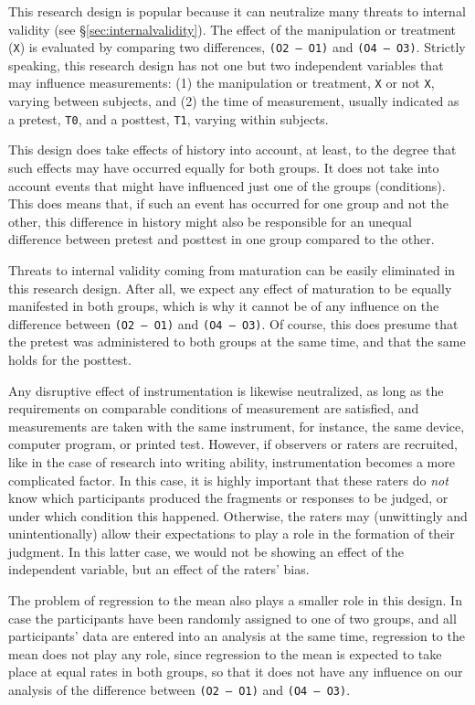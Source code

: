 \documentclass[
]{book}
\begin{document}
This research design is popular because it can neutralize many threats to internal validity (see §\ref{sec:internalvalidity}). The effect of the manipulation or treatment (\texttt{X}) is evaluated by comparing two differences, \texttt{(O2\ –\ O1)} and \texttt{(O4\ –\ O3)}. Strictly speaking, this research design has not one but two independent variables that may influence measurements: (1) the manipulation or treatment, \texttt{X} or not \texttt{X}, varying between subjects, and (2) the time of measurement, usually indicated as a pretest, \texttt{T0}, and a posttest, \texttt{T1}, varying within subjects.

This design does take effects of history into account, at least, to the degree that such effects may have occurred equally for both groups. It does not take into account events that might have influenced just one of the groups (conditions). This does means that, if such an event has occurred for one group and not the other, this difference in history might also be responsible for an unequal difference between pretest and posttest in one group compared to the other.

Threats to internal validity coming from maturation can be easily eliminated in this research design. After all, we expect any effect of maturation to be equally manifested in both groups, which is why it cannot be of any influence on the difference between \texttt{(O2\ –\ O1)} and \texttt{(O4\ –\ O3)}. Of course, this does presume that the pretest was administered to both groups at the same time, and that the same holds for the posttest.

Any disruptive effect of instrumentation is likewise neutralized, as long as the requirements on comparable conditions of measurement are satisfied, and measurements are taken with the same instrument, for instance, the same device, computer program, or printed test. However, if observers or raters are recruited, like in the case of research into writing ability, instrumentation becomes a more complicated factor. In this case, it is highly important that these raters do \emph{not} know which participants produced the fragments or responses to be judged, or under which condition this happened. Otherwise, the raters may (unwittingly and unintentionally) allow their expectations to play a role in the formation of their judgment. In this latter case, we would not be showing an effect of the independent variable, but an effect of the raters' bias.

The problem of regression to the mean also plays a smaller role in this design. In case the participants have been randomly assigned to one of two groups, and all participants' data are entered into an analysis at the same time, regression to the mean does not play any role, since regression to the mean is expected to take place at equal rates in both groups, so that it does not have any influence on our analysis of the difference between \texttt{(O2\ –\ O1)} and \texttt{(O4\ –\ O3)}.
\end{document}
